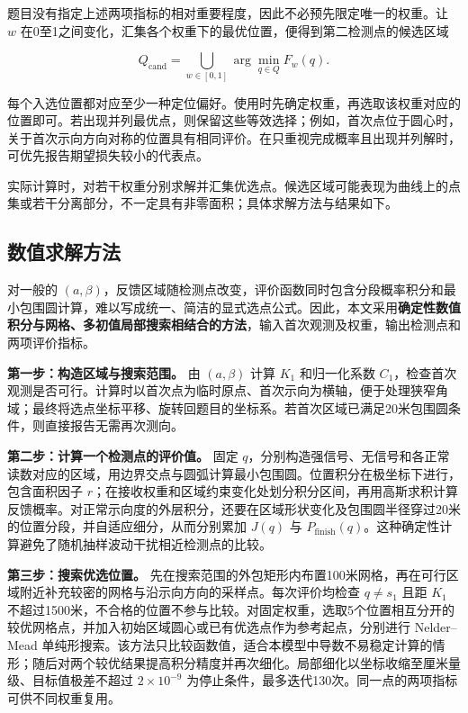 题目没有指定上述两项指标的相对重要程度，因此不必预先限定唯一的权重。让 \(w\) 在0至1之间变化，汇集各个权重下的最优位置，便得到第二检测点的候选区域

\begin{equation}
 Q_{\mathrm{cand}}=\bigcup_{w\in[0,1]}\arg\min_{q\in Q}F_w(q).
\label{eq:q2-candidate-region}
\end{equation}

每个入选位置都对应至少一种定位偏好。使用时先确定权重，再选取该权重对应的位置即可。若出现并列最优点，则保留这些等效选择；例如，首次点位于圆心时，关于首次示向方向对称的位置具有相同评价。在只重视完成概率且出现并列解时，可优先报告期望损失较小的代表点。

实际计算时，对若干权重分别求解并汇集优选点。候选区域可能表现为曲线上的点集或若干分离部分，不一定具有非零面积；具体求解方法与结果如下。

\subsection{数值求解方法}

对一般的 \((a,\beta)\)，反馈区域随检测点改变，评价函数同时包含分段概率积分和最小包围圆计算，难以写成统一、简洁的显式选点公式。因此，本文采用\textbf{确定性数值积分与网格、多初值局部搜索相结合的方法}，输入首次观测及权重，输出检测点和两项评价指标。

\textbf{第一步：构造区域与搜索范围。} 由 \((a,\beta)\) 计算 \(K_1\) 和归一化系数 \(C_1\)，检查首次观测是否可行。计算时以首次点为临时原点、首次示向为横轴，便于处理狭窄角域；最终将选点坐标平移、旋转回题目的坐标系。若首次区域已满足20米包围圆条件，则直接报告无需再次测向。

\textbf{第二步：计算一个检测点的评价值。} 固定 \(q\)，分别构造强信号、无信号和各正常读数对应的区域，用边界交点与圆弧计算最小包围圆。位置积分在极坐标下进行，包含面积因子 \(r\)；在接收权重和区域约束变化处划分积分区间，再用高斯求积计算反馈概率。对正常示向度的外层积分，还要在区域形状变化及包围圆半径穿过20米的位置分段，并自适应细分，从而分别累加 \(J(q)\) 与 \(P_{\mathrm{finish}}(q)\)。这种确定性计算避免了随机抽样波动干扰相近检测点的比较。

\textbf{第三步：搜索优选位置。} 先在搜索范围的外包矩形内布置100米网格，再在可行区域附近补充较密的网格与沿示向方向的采样点。每次评价均检查 \(q\ne s_1\) 且距 \(K_1\) 不超过1500米，不合格的位置不参与比较。对固定权重，选取5个位置相互分开的较优网格点，并加入初始区域圆心或已有优选点作为参考起点，分别进行 Nelder--Mead 单纯形搜索。该方法只比较函数值，适合本模型中导数不易稳定计算的情形；随后对两个较优结果提高积分精度并再次细化。局部细化以坐标收缩至厘米量级、目标值极差不超过 \(2\times10^{-9}\) 为停止条件，最多迭代130次。同一点的两项指标可供不同权重复用。

